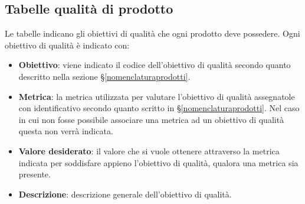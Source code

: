 \subsection{Tabelle qualità di prodotto} \label{tabellequalitaprodotto}
Le tabelle indicano gli obiettivi di qualità che ogni prodotto deve possedere.
Ogni obiettivo di qualità è indicato con:

\begin{itemize}
	\item \textbf{Obiettivo}: viene indicato il codice dell'obiettivo di qualità secondo quanto descritto nella sezione \S\ref{nomenclaturaprodotti}.
	\item \textbf{Metrica}: la metrica utilizzata per valutare l'obiettivo di qualità assegnatole con identificativo secondo quanto scritto in \S\ref{nomenclaturaprodotti}. Nel caso in cui non fosse possibile associare una metrica ad un obiettivo di qualità questa non verrà indicata.
	\item \textbf{Valore desiderato}: il valore che si vuole ottenere attraverso la metrica indicata per soddisfare appieno l'obiettivo di qualità, qualora una metrica sia presente.
	\item \textbf{Descrizione}: descrizione generale dell'obiettivo di qualità.
\end{itemize}

